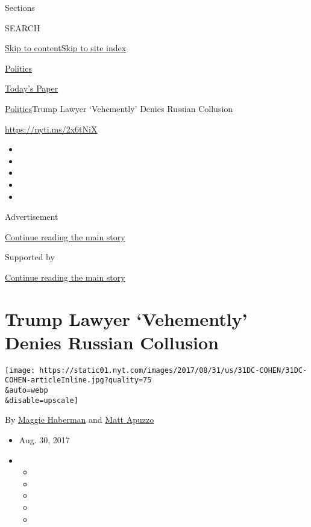 Sections

SEARCH

\protect\hyperlink{site-content}{Skip to
content}\protect\hyperlink{site-index}{Skip to site index}

\href{https://www.nytimes.com/section/politics}{Politics}

\href{https://myaccount.nytimes.com/auth/login?response_type=cookie\&client_id=vi}{}

\href{https://www.nytimes.com/section/todayspaper}{Today's Paper}

\href{/section/politics}{Politics}\textbar{}Trump Lawyer `Vehemently'
Denies Russian Collusion

\url{https://nyti.ms/2x6tNiX}

\begin{itemize}
\item
\item
\item
\item
\item
\end{itemize}

Advertisement

\protect\hyperlink{after-top}{Continue reading the main story}

Supported by

\protect\hyperlink{after-sponsor}{Continue reading the main story}

\hypertarget{trump-lawyer-vehemently-denies-russian-collusion}{%
\section{Trump Lawyer `Vehemently' Denies Russian
Collusion}\label{trump-lawyer-vehemently-denies-russian-collusion}}

\texttt{[image: https://static01.nyt.com/images/2017/08/31/us/31DC-COHEN/31DC-COHEN-articleInline.jpg?quality=75\\\&auto=webp\\\&disable=upscale]}

By \href{http://www.nytimes.com/by/maggie-haberman}{Maggie Haberman} and
\href{http://www.nytimes.com/by/matt-apuzzo}{Matt Apuzzo}

\begin{itemize}
\item
  Aug. 30, 2017
\item
  \begin{itemize}
  \item
  \item
  \item
  \item
  \item
  \end{itemize}
\end{itemize}


